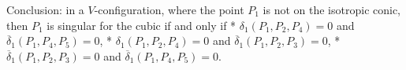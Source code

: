 \documentclass[11pt]{article}
\begin{document}
    Conclusion: in a \(V\)-configuration, where the point \(P_1\) is not on
the isotropic conic, then \(P_1\) is singular for the cubic if and only
if * \(\delta_1(P_1, P_2, P_4) = 0\) and
\(\overline{\delta}_1(P_1, P_4, P_5) = 0\), *
\(\delta_1(P_1, P_2, P_4) = 0\) and
\(\overline{\delta}_1(P_1, P_2, P_3) = 0\), *
\(\overline{\delta}_1(P_1, P_2, P_3) = 0\) and
\(\overline{\delta}_1(P_1, P_4, P_5) = 0\).


    
    
    
\end{document}
